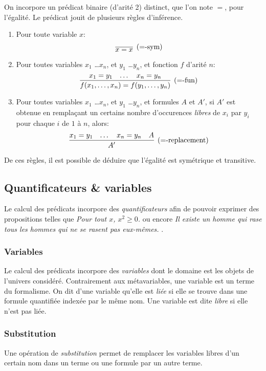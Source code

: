 On incorpore un prédicat binaire (d'arité 2) distinct, que l'on note ${=}$, pour l'égalité.
Le prédicat jouit de plusieurs règles d'inférence.
\begin{enumerate}
\item Pour toute variable $x$:
\[
\infer[({=}\text{-sym})]{x = x}{}
\]
\item Pour toutes variables $x_1$ \dots $x_n$, et $y_1$ \dots $y_n$, et fonction $f$ d'arité $n$:
\[
\infer[({=}\text{-fun})]{f(x_1, \dots, x_n) = f(y_1, \dots, y_n)}{x_1 = y_1 & \dots & x_n = y_n}
\]
\item Pour toutes variables  $x_1$ \dots $x_n$, et $y_1$ \dots $y_n$, et formules $A$ et $A'$, si $A'$ est obtenue en remplaçant un certains nombre d'occurences \textit{libres} de $x_i$ par $y_i$ pour chaque $i$ de $1$ à $n$, alors:
\[
\infer[({=}\text{-replacement})]{A'}{x_1 = y_1 & \dots & x_n = y_n & A}
\]
\end{enumerate}

De ces règles, il est possible de déduire que l'égalité est symétrique et transitive. 


\subsection{Quantificateurs \& variables}

Le calcul des prédicats incorpore des \og \textit{quantificateurs} \fg{} afin de pouvoir exprimer des propositions telles que \og \textit{Pour tout $x$, $x^2 \geq 0$.} \fg{} ou encore \og \textit{Il existe un homme qui rase tous les hommes qui ne se rasent pas eux-mêmes.} \fg{}.

\subsubsection{Variables}

Le calcul des prédicats incorpore des \og \textit{variables} \fg{} dont le domaine est les objets de l'univers considéré.
Contrairement aux métavariables, une variable est un terme du formalisme.
On dit d'une variable qu'elle est \og \textit{liée} \fg{} si elle se trouve dans une formule quantifiée indexée par le même nom.
Une variable est dite \og \textit{libre} \fg{} si elle n'est pas liée.

\subsubsection{Substitution}

Une opération de \og \textit{substitution} \fg{} permet de remplacer les variables libres d'un certain nom dans un terme ou une formule par un autre terme.

